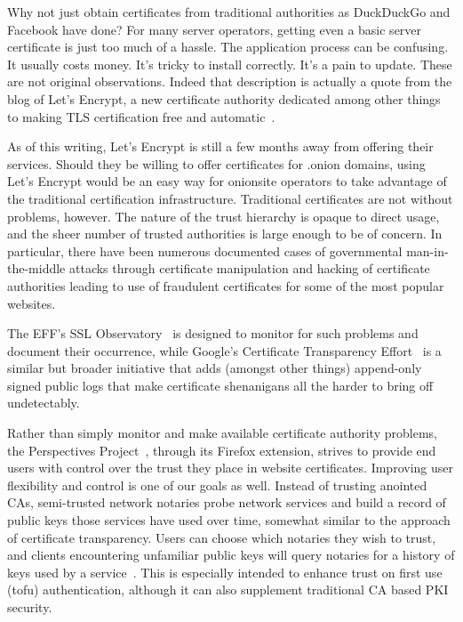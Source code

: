 \documentclass[10pt, conference, compsocconf]{styles/IEEEtran}
\begin{document}
Why not just obtain certificates from traditional authorities as
DuckDuckGo and Facebook have done? For many server operators, getting
even a basic server certificate is just too much of a hassle. The
application process can be confusing. It usually costs money. It's
tricky to install correctly. It's a pain to update. These are not 
original observations. Indeed that description is actually a quote
from the blog of
Let's Encrypt, a new certificate authority dedicated among other
things to making TLS certification free and automatic~\cite{lets-encrypt}.

As of this writing, Let's Encrypt is still a few months away
from offering their services.
Should they be willing to offer certificates for .onion
domains, using Let's Encrypt would be an easy way for
onionsite operators to take advantage of the traditional certification
infrastructure. Traditional certificates are not without problems,
however. The nature of the trust hierarchy is opaque to direct usage,
and the sheer number of trusted authorities is large enough to be of
concern. In particular, there have been numerous documented cases of
governmental man-in-the-middle attacks through certificate
manipulation and hacking of certificate authorities leading to use of
fraudulent certificates for some of the most popular websites.

The EFF's SSL Observatory~\cite{ssl-observatory} is designed to
monitor for such problems and document their occurrence, while
Google's Certificate Transparency
Effort~\cite{certificate-transparency} is a similar but broader
initiative that adds (amongst other things) append-only signed public
logs that make certificate shenanigans all the harder to bring off
undetectably.

Rather than simply monitor and make available certificate authority
problems, the Perspectives Project~\cite{perspectives}, through its
Firefox extension, strives to
provide end users with control over the trust they place in website
certificates. Improving user flexibility
and control is one of our goals as well. Instead of trusting
anointed CAs, semi-trusted network notaries probe network services and
build a record of public keys those services have used over time,
somewhat similar to the approach of certificate transparency. Users
can choose which notaries they wish to trust, and clients encountering
unfamiliar public keys will query notaries for a history of keys used
by a service~\cite{perspectives-paper}. This is especially intended to
enhance trust on first use (tofu) authentication, although it can also
supplement traditional CA based PKI security. 
\end{document}
